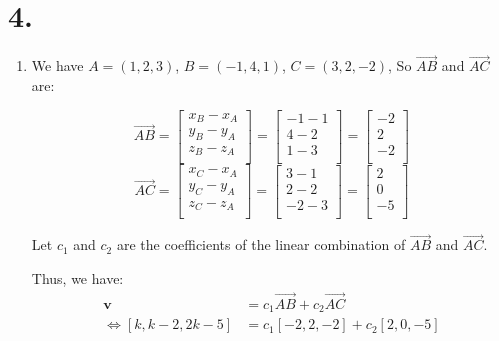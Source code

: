 \documentclass{article}
\begin{document}
        \newpage
        \section*{4.}

        \begin{enumerate}[label=({\alph*})]
            \item    
            We have \(A = (1,2,3)\), \(B = (-1, 4, 1)\), \(C = (3, 2, -2)\), So \(\overrightarrow{AB}\) and \(\overrightarrow{AC}\) are:

            \[\overrightarrow{AB} =  \begin{bmatrix}x_{B} - x_{A}\\y_{B} - y_{A}\\z_{B} - z_{A}\\\end{bmatrix} = \begin{bmatrix}-1 - 1\\4 - 2\\1 - 3\\\end{bmatrix} = \begin{bmatrix}-2\\2\\-2\\\end{bmatrix}\]
            \[\overrightarrow{AC} =  \begin{bmatrix}x_{C} - x_{A}\\y_{C} - y_{A}\\z_{C} - z_{A}\\\end{bmatrix} = \begin{bmatrix}3 - 1\\2 - 2\\-2 - 3\\\end{bmatrix} = \begin{bmatrix}2\\0\\-5\\\end{bmatrix}\]

            Let \(c_{1}\) and \(c_{2}\) are the coefficients of the linear combination of \(\overrightarrow{AB}\) and \(\overrightarrow{AC}\).

            Thus, we have:
            \begin{align*}
                \textbf{v} &= c_{1}\textbf{\(\overrightarrow{AB}\)} + c_{2}\textbf{\(\overrightarrow{AC}\)}\\
                \Leftrightarrow [k,k - 2,2k - 5] &= c_{1}[-2,2,-2] + c_{2}[2,0,-5]\\
            \end{align*}


\end{enumerate}
\end{document}
